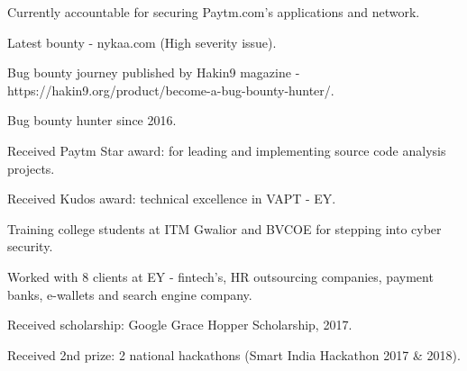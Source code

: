 
\cvsubsection{}

  \begin{cvitems} %
    \item {Currently accountable for securing Paytm.com's applications and network.}
    \item {Latest bounty - nykaa.com (High severity issue).}
    \item {Bug bounty journey published by Hakin9 magazine - https://hakin9.org/product/become-a-bug-bounty-hunter/.}
    \item {Bug bounty hunter since 2016.}
    \item {Received Paytm Star award: for leading and implementing source code analysis projects.}
    \item {Received Kudos award: technical excellence in VAPT - EY.}
    \item {Training college students at ITM Gwalior and BVCOE for stepping into cyber security.}
    \item {Worked with 8 clients at EY - fintech’s, HR outsourcing companies, payment banks, e-wallets and search engine company.}
    \item {Received scholarship: Google Grace Hopper Scholarship, 2017.}
    \item {Received 2nd prize: 2 national hackathons (Smart India Hackathon 2017 \& 2018).}

  \end{cvitems}
